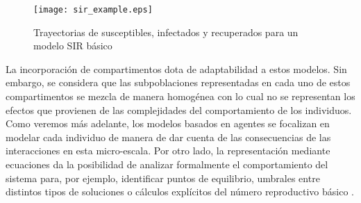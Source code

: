 \begin{figure}[h]
    \centering
    \texttt{[image: sir\_example.eps]}
    \caption{Trayectorias de susceptibles, infectados y recuperados para un modelo SIR básico}
    \label{fig:sir_example}
\end{figure}

La incorporación de compartimentos dota de adaptabilidad a estos modelos. Sin embargo, se considera que las subpoblaciones representadas en cada uno de estos compartimentos se mezcla de manera homogénea con lo cual no se representan los efectos que provienen de las complejidades del comportamiento de los individuos. Como veremos más adelante, los modelos basados en agentes se focalizan en modelar cada individuo de manera de dar cuenta de las consecuencias de las interacciones en esta micro-escala. Por otro lado, la representación mediante ecuaciones da la posibilidad de analizar formalmente el comportamiento del sistema para, por ejemplo, identificar puntos de equilibrio, umbrales entre distintos tipos de soluciones o cálculos explícitos del número reproductivo básico \citep{Murray2007}.

